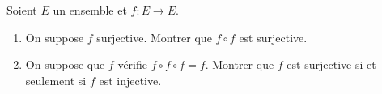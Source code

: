 \begin{enonce}
\begin{exercise}[ID={RMS 121.2 1107, CCP PC 2010},subtitle={},tags={}, difficulty={0}]
Soient $E$ un ensemble et $f:E\to E$.
\begin{enumerate}
    \item On suppose $f$ surjective. Montrer que $f\circ f$ est surjective.
    \item On suppose que $f$ vérifie $f\circ f\circ f=f$. Montrer que $f$ est surjective si et seulement si $f$ est injective.
\end{enumerate}
\end{exercise}
\begin{solution}
\end{solution}
\end{enonce}
